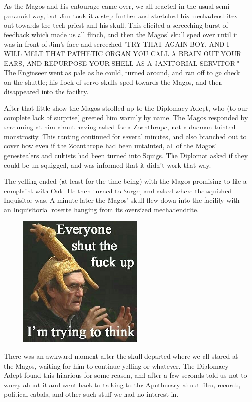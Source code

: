 As the Magos and his entourage came over, we all reacted in the usual semi-paranoid way, but Jim took it a step further and stretched his mechadendrites out towards the tech-priest and his skull. 
This elicited a screeching burst of feedback which made us all flinch, and then the Magos' skull sped over until it was in front of Jim's face and screeched "TRY THAT AGAIN BOY, AND I WILL MELT THAT PATHETIC ORGAN YOU CALL A BRAIN OUT YOUR EARS, AND REPURPOSE YOUR SHELL AS A JANITORIAL SERVITOR." The Enginseer went as pale as he could, turned around, and ran off to go check on the shuttle; 
his flock of servo-skulls sped towards the Magos, and then disappeared into the facility. 


After that little show the Magos strolled up to the Diplomacy Adept, who (to our complete lack of surprise) greeted him warmly by name. 
The Magos responded by screaming at him about having asked for a Zoanthrope, not a daemon-tainted monstrosity. 
This ranting continued for several minutes, and also branched out to cover how even if the Zoanthrope had been untainted, all of the Magos' genestealers and cultists had been turned into Squigs. 
The Diplomat asked if they could be un-squigged, and was informed that it didn't work that way.

The yelling ended (at least for the time being) with the Magos promising to file a complaint with Oak. 
He then turned to Sarge, and asked where the squished Inquisitor was. 
A minute later the Magos' skull flew down into the facility with an Inquisitorial rosette hanging from its oversized mechadendrite.

\begin{figure}
	\begin{center}
		\includegraphics[width=\figwidth]{pics/16/65.png}
	\end{center}
\end{figure}
There was an awkward moment after the skull departed where we all stared at the Magos, waiting for him to continue yelling or whatever. 
The Diplomacy Adept found this hilarious for some reason, and after a few seconds told us not to worry about it and went back to talking to the Apothecary about files, records, political cabals, and other such stuff we had no interest in.

